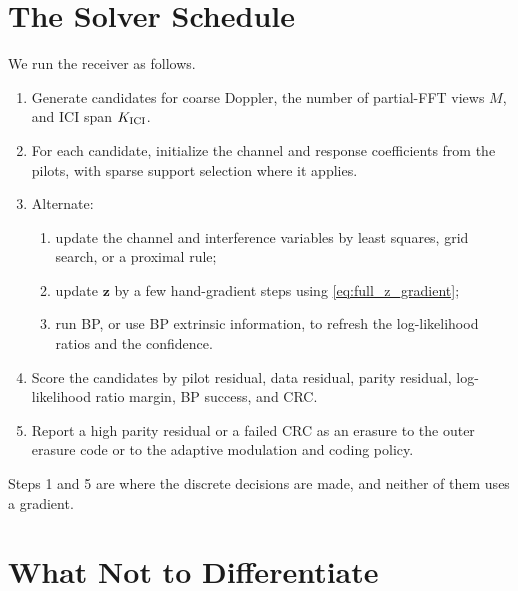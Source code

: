 \documentclass[11pt]{article}
\begin{document}
\section{The Solver Schedule}

We run the receiver as follows.
\begin{enumerate}
  \item Generate candidates for coarse Doppler, the number of partial-FFT views $M$, and
  ICI span $K_{\rm ICI}$.
  \item For each candidate, initialize the channel and response coefficients from
  the pilots, with sparse support selection where it applies.
  \item Alternate:
  \begin{enumerate}
    \item update the channel and interference variables by least squares,
    grid search, or a proximal rule;
    \item update $\bm z$ by a few hand-gradient steps using
    \eqref{eq:full_z_gradient};
    \item run BP, or use BP extrinsic information, to refresh the
    log-likelihood ratios and the confidence.
  \end{enumerate}
  \item Score the candidates by pilot residual, data residual, parity residual,
  log-likelihood ratio margin, BP success, and CRC.
  \item Report a high parity residual or a failed CRC as an erasure to the outer
  erasure code or to the adaptive modulation and coding policy.
\end{enumerate}
Steps 1 and 5 are where the discrete decisions are made, and neither of them
uses a gradient.

\section{What Not to Differentiate}
\end{document}
